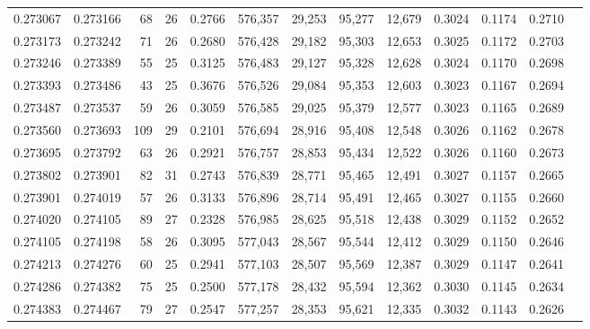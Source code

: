 \begin{tabular}{rrrrrrrrrrrrr}
0.273067 & 0.273166 &  68 &  26 &                                     0.2766 & 576,357 &  29,253 &  95,277 &  12,679 & 0.3024 & 0.1174 & 0.2710 \\
0.273173 & 0.273242 &  71 &  26 &                                     0.2680 & 576,428 &  29,182 &  95,303 &  12,653 & 0.3025 & 0.1172 & 0.2703 \\
0.273246 & 0.273389 &  55 &  25 &                                     0.3125 & 576,483 &  29,127 &  95,328 &  12,628 & 0.3024 & 0.1170 & 0.2698 \\
0.273393 & 0.273486 &  43 &  25 &                                     0.3676 & 576,526 &  29,084 &  95,353 &  12,603 & 0.3023 & 0.1167 & 0.2694 \\
0.273487 & 0.273537 &  59 &  26 &                                     0.3059 & 576,585 &  29,025 &  95,379 &  12,577 & 0.3023 & 0.1165 & 0.2689 \\
0.273560 & 0.273693 & 109 &  29 &                                     0.2101 & 576,694 &  28,916 &  95,408 &  12,548 & 0.3026 & 0.1162 & 0.2678 \\
0.273695 & 0.273792 &  63 &  26 &                                     0.2921 & 576,757 &  28,853 &  95,434 &  12,522 & 0.3026 & 0.1160 & 0.2673 \\
0.273802 & 0.273901 &  82 &  31 &                                     0.2743 & 576,839 &  28,771 &  95,465 &  12,491 & 0.3027 & 0.1157 & 0.2665 \\
0.273901 & 0.274019 &  57 &  26 &                                     0.3133 & 576,896 &  28,714 &  95,491 &  12,465 & 0.3027 & 0.1155 & 0.2660 \\
0.274020 & 0.274105 &  89 &  27 &                                     0.2328 & 576,985 &  28,625 &  95,518 &  12,438 & 0.3029 & 0.1152 & 0.2652 \\
0.274105 & 0.274198 &  58 &  26 &                                     0.3095 & 577,043 &  28,567 &  95,544 &  12,412 & 0.3029 & 0.1150 & 0.2646 \\
0.274213 & 0.274276 &  60 &  25 &                                     0.2941 & 577,103 &  28,507 &  95,569 &  12,387 & 0.3029 & 0.1147 & 0.2641 \\
0.274286 & 0.274382 &  75 &  25 &                                     0.2500 & 577,178 &  28,432 &  95,594 &  12,362 & 0.3030 & 0.1145 & 0.2634 \\
0.274383 & 0.274467 &  79 &  27 &                                     0.2547 & 577,257 &  28,353 &  95,621 &  12,335 & 0.3032 & 0.1143 & 0.2626 \\

\end{tabular}
